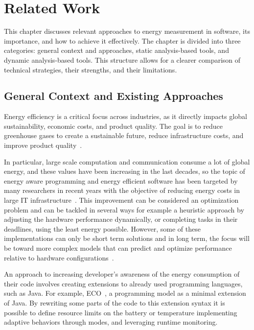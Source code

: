 
\chapter{Related Work}\label{chapter:related_work}

This chapter discusses relevant approaches to energy measurement in software, its importance, and how to achieve it effectively. The chapter is divided into three categories: general context and approaches, static analysis-based tools, and dynamic analysis-based tools. This structure allows for a clearer comparison of technical strategies, their strengths, and their limitations.

\section{General Context and Existing Approaches}

Energy efficiency is a critical focus across industries, as it directly impacts global sustainability, economic costs, and product quality.  The goal is to reduce greenhouse gases to create a sustainable future, reduce infrastructure costs, and improve product quality~\cite{annurev:/content/journals/10.1146/annurev.resource.102308.124234}. 

In particular, large scale computation and communication consume a lot of global energy, and these values have been increasing in the last decades, so the topic of energy aware programming and energy efficient software has been targeted by many researchers in recent years with the objective of reducing energy costs in large IT infrastructure~\cite{8880037}.
This improvement can be considered an optimization problem and can be tackled in several ways for example a heuristic approach by adjusting the hardware performance dynamically, or completing tasks in their deadlines, using the least energy possible. However, some of these implementations can only be short term solutions and in long term, the focus will be toward more complex models that can predict and optimize performance relative to hardware configurations~\cite{10.1145/1666420.1666438}. 

An approach to increasing developer's awareness of the energy consumption of their code involves creating extensions to already used programming languages, such as Java. For example, ECO~\cite{7194624}, a programming model as a minimal extension of Java. By rewriting some parts of the code to this extension syntax it is possible to define resource limits on the battery or temperature implementing adaptive behaviors through modes, and leveraging runtime monitoring.

